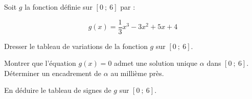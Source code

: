 \documentclass[11pt,a4paper]{article}  %
\begin{document}

Soit $g$ la fonction définie sur $[0\ ;\ 6]$ par :

$$
g(x)=\frac{1}{3} x^3-3x^2+5x+4
$$

\begin{enumMet}
	\item Dresser le tableau de variations de la fonction $g$ sur $[0\ ;\ 6]$.
	\item Montrer que l'équation $g(x)=0$ admet une solution unique $\alpha$ dans $[0\ ;\ 6]$. Déterminer un encadrement de $\alpha$ au millième près.
	\item En déduire le tableau de signes de $g$ sur $[0\ ;\ 6]$.
\end{enumMet}
\end{document}

